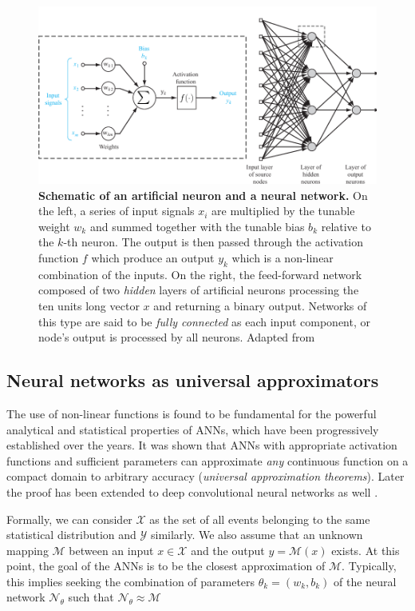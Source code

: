 \begin{figure}[H]
    \centering
    \includegraphics[width=\textwidth]{figures/Intro/neuron2.pdf}
    \caption{\textbf{Schematic of an artificial neuron and a neural network.} On the left, a series of input signals 
    $x_i$ are multiplied by the tunable weight $w_{k}$ and summed together with the tunable bias $b_k$ relative to 
    the $k$-th neuron. The output is then passed through the activation function $f$ which produce an output $y_k$ 
    which is a non-linear combination of the inputs. On the right, the feed-forward network composed 
    of two \textit{hidden} layers of artificial neurons processing the ten units long vector $x$ and returning a 
    binary output. Networks of this type are said to be \textit{fully connected} as each input component, or 
    node's output is processed by all neurons. Adapted from \cite{haykin2009neural}}
    \label{fig:neuron}
\end{figure}

\subsection{Neural networks as universal approximators}

The use of non-linear functions is found to be fundamental for the powerful analytical and statistical properties of ANNs, 
which have been progressively 
established over the years. It was shown \cite{Cybenko1989, Hornik_1989, Leshno_1993} that ANNs with appropriate 
activation functions and sufficient parameters can approximate \textit{any} continuous function on a compact domain to arbitrary 
accuracy (\textit{universal approximation theorems}). Later the proof has been extended to deep convolutional neural 
networks as well \cite{UniversalityCNN_2020}.

Formally, we can consider $\mathcal{X}$ as the set of all events belonging to the same statistical distribution and 
$\mathcal{Y}$ similarly. We also assume that an unknown mapping $\mathcal{M}$ between an input $x \in \mathcal{X}$ and the output 
$y = \mathcal{M}(x)$ exists. At this point, the goal of the ANNs is to be the closest approximation of $\mathcal{M}$.
Typically, this implies seeking the combination of parameters $\theta_k = (w_k, b_k)$ of the neural network $\mathcal{N}_{\theta}$ 
such that $\mathcal{N}_{\theta} \approx \mathcal{M}$

